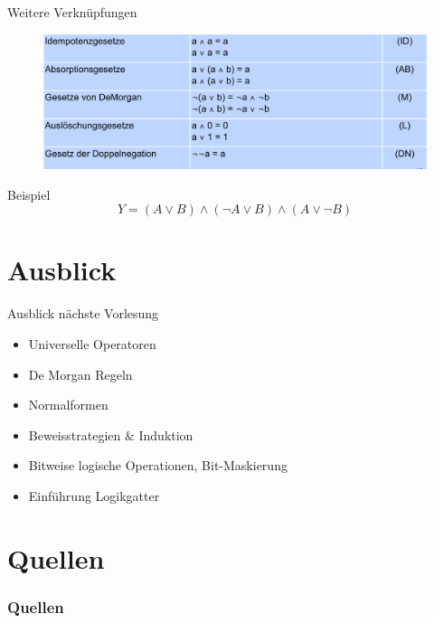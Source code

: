 \documentclass[12pt%
,aspectratio=169%
]{beamer}
\begin{document}
\begin{frame}{Weitere Verknüpfungen}
\begin{figure}
\includegraphics[scale=0.325]{pictures/ops2}
\end{figure}
\cite{hoffmann2020grundlagen}
\end{frame}

\begin{frame}{Beispiel}
$$ Y = (A \lor B) \land (\neg A \lor B) \land (A \lor \neg B) $$
\end{frame}

\section{Ausblick}
\begin{frame}{Ausblick nächste Vorlesung}
\begin{itemize}
	\item Universelle Operatoren
	\item De Morgan Regeln
	\item Normalformen
	\item Beweisstrategien \& Induktion
	\item Bitweise logische Operationen, Bit-Maskierung
	\item Einführung Logikgatter
\end{itemize}

\end{frame}

\section*{Quellen}
\appendix
\begin{frame}[allowframebreaks]
  \frametitle<presentation>{Quellen}
\printbibliography
\end{frame}
\end{document}
